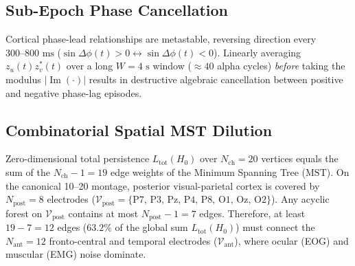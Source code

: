 \documentclass[10pt,twocolumn]{article}
\begin{document}
\subsection{Sub-Epoch Phase Cancellation}
Cortical phase-lead relationships are metastable, reversing direction every $300\text{--}800\text{ ms}$ ($\sin\Delta\phi(t) > 0 \leftrightarrow \sin\Delta\phi(t) < 0$). Linearly averaging $z_u(t)z_v^*(t)$ over a long $W = 4\text{ s}$ window ($\approx 40$ alpha cycles) \textit{before} taking the modulus $|\operatorname{Im}(\cdot)|$ results in destructive algebraic cancellation between positive and negative phase-lag episodes.

\subsection{Combinatorial Spatial MST Dilution}
Zero-dimensional total persistence $L_{\mathrm{tot}}(H_0)$ over $N_{\mathrm{ch}} = 20$ vertices equals the sum of the $N_{\mathrm{ch}} - 1 = 19$ edge weights of the Minimum Spanning Tree ($\mathrm{MST}$). On the canonical 10--20 montage, posterior visual-parietal cortex is covered by $N_{\mathrm{post}} = 8$ electrodes ($\mathcal{V}_{\mathrm{post}} = \{\text{P7, P3, Pz, P4, P8, O1, Oz, O2}\}$). Any acyclic forest on $\mathcal{V}_{\mathrm{post}}$ contains at most $N_{\mathrm{post}} - 1 = 7$ edges. Therefore, at least $19 - 7 = 12$ edges ($63.2\%$ of the global sum $L_{\mathrm{tot}}(H_0)$) must connect the $N_{\mathrm{ant}} = 12$ fronto-central and temporal electrodes ($\mathcal{V}_{\mathrm{ant}}$), where ocular (EOG) and muscular (EMG) noise dominate.
\end{document}
